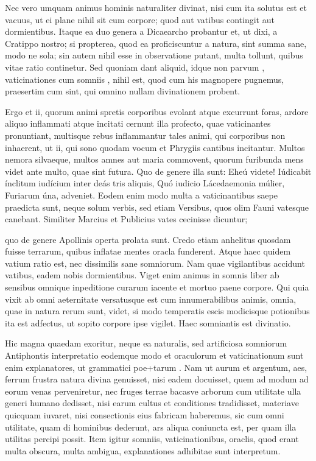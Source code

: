  Nec vero umquam animus hominis naturaliter divinat, nisi cum ita solutus est et vacuus, ut ei plane nihil sit cum corpore; quod aut vatibus contingit aut dormientibus. Itaque ea duo genera a Dicaearcho probantur et, ut dixi, a Cratippo nostro; si propterea, quod ea proficiscuntur a natura, sint summa sane, modo ne sola; sin autem nihil esse in observatione putant, multa tollunt, quibus vitae ratio continetur. Sed quoniam dant aliquid, idque non parvum , vaticinationes cum somniis , nihil est, quod cum his magnopere pugnemus, praesertim cum sint, qui omnino nullam divinationem probent.

 Ergo et ii, quorum animi spretis corporibus evolant atque excurrunt foras, ardore aliquo inflammati atque incitati cernunt illa profecto, quae vaticinantes pronuntiant, multisque rebus inflammantur tales animi, qui corporibus non inhaerent, ut ii, qui sono quodam vocum et Phrygiis cantibus incitantur. Multos nemora silvaeque, multos amnes aut maria commovent, quorum furibunda mens videt ante multo, quae sint futura. Quo de genere illa sunt: Eheú videte! Iúdicabit ínclitum iudícium inter deás tris aliquis, Quó iudicio Lácedaemonia múlier, Furiarum úna, adveniet. Eodem enim modo multa a vaticinantibus saepe praedicta sunt, neque solum verbis, sed etiam Versibus, quos olim Fauni vatesque canebant. Similiter Marcius et Publicius vates cecinisse dicuntur;

 quo de genere Apollinis operta prolata sunt. Credo etiam anhelitus quosdam fuisse terrarum, quibus inflatae mentes oracla funderent. Atque haec quidem vatium ratio est, nec dissimilis sane somniorum. Nam quae vigilantibus accidunt vatibus, eadem nobis dormientibus. Viget enim animus in somnis liber ab sensibus omnique inpeditione curarum iacente et mortuo paene corpore. Qui quia vixit ab omni aeternitate versatusque est cum innumerabilibus animis, omnia, quae in natura rerum sunt, videt, si modo temperatis escis modicisque potionibus ita est adfectus, ut sopito corpore ipse vigilet. Haec somniantis est divinatio.

 Hic magna quaedam exoritur, neque ea naturalis, sed artificiosa somniorum Antiphontis interpretatio eodemque modo et oraculorum et vaticinationum sunt enim explanatores, ut grammatici poe+tarum . Nam ut aurum et argentum, aes, ferrum frustra natura divina genuisset, nisi eadem docuisset, quem ad modum ad eorum venas perveniretur, nec fruges terrae bacasve arborum cum utilitate ulla generi humano dedisset, nisi earum cultus et conditiones tradidisset, materiave quicquam iuvaret, nisi consectionis eius fabricam haberemus, sic cum omni utilitate, quam di hominibus dederunt, ars aliqua coniuncta est, per quam illa utilitas percipi possit. Item igitur somniis, vaticinationibus, oraclis, quod erant multa obscura, multa ambigua, explanationes adhibitae sunt interpretum.

